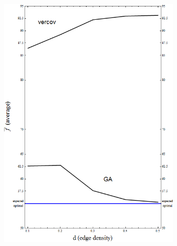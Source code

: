 \documentclass[12pt]{article}
\begin{document}
\begin{figure}[!h]

\begin{subfigure}{0.5\textwidth}
\includegraphics[width=1\linewidth]{av1} 
\end{subfigure}
\begin{subfigure}{0.5\textwidth}

\end{subfigure}
\end{figure}
\end{document}
